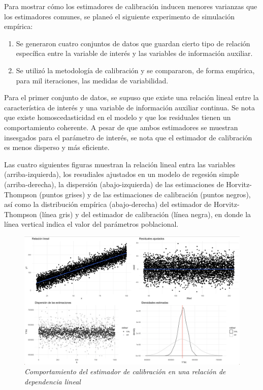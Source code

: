 \documentclass[
  12pt,
  spanish,
]{book}
\providecommand{\tightlist}{%
  \setlength{\itemsep}{0pt}\setlength{\parskip}{0pt}}
\begin{document}
Para mostrar cómo los estimadores de calibración inducen menores varianzas que los estimadores comunes, se planeó el siguiente experimento de simulación empírica:

\begin{enumerate}
\def\labelenumi{\arabic{enumi}.}
\tightlist
\item
  Se generaron cuatro conjuntos de datos que guardan cierto tipo de relación específica entre la variable de interés y las variables de información auxiliar.
\item
  Se utilizó la metodología de calibración y se compararon, de forma empírica, para mil iteraciones, las medidas de variabilidad.
\end{enumerate}

Para el primer conjunto de datos, se supuso que existe una relación lineal entre la característica de interés y una variable de información auxiliar continua. Se nota que existe homoscedasticidad en el modelo y que los residuales tienen un comportamiento coherente. A pesar de que ambos estimadores se muestran insesgados para el parámetro de interés, se nota que el estimador de calibración es menos disperso y más eficiente.

Las cuatro siguientes figuras muestran la relación lineal entra las variables (arriba-izquierda), los resudiales ajustados en un modelo de regesión simple (arriba-derecha), la dispersión (abajo-izquierda) de las estimaciones de Horvitz-Thompson (puntos grises) y de las estimaciones de calibración (puntos negros), así como la distribución empírica (abajo-derecha) del estimador de Horvitz-Thompson (línea gris) y del estimador de calibración (línea negra), en donde la línea vertical indica el valor del parámetros poblacional.

\begin{figure}
\centering
\includegraphics{Pics/c5.png}
\caption{\emph{Comportamiento del estimador de calibración en una relación de dependencia lineal}}
\end{figure}
\end{document}
